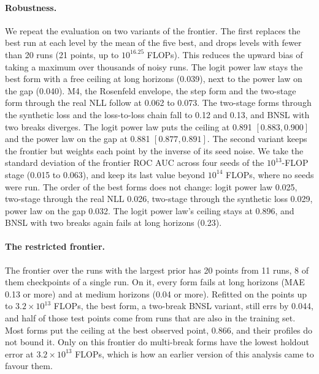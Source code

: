 \paragraph{Robustness.}
We repeat the evaluation on two variants of the frontier. The first replaces the best run at each level by the mean
of the five best, and drops levels with fewer than 20 runs (21 points, up to $10^{16.25}$ FLOPs). This reduces the
upward bias of taking a maximum over thousands of noisy runs. The logit power law stays the best form with a free
ceiling at long horizons (0.039), next to the power law on the gap (0.040). M4, the Rosenfeld envelope, the step form and
the two-stage form through the real NLL follow at 0.062 to 0.073. The two-stage forms through the synthetic loss and the
loss-to-loss chain fall to 0.12 and 0.13, and BNSL with two breaks diverges. The logit power law puts the ceiling at
0.891 $[0.883, 0.900]$ and the power law on the gap at 0.881 $[0.877, 0.891]$. The second variant keeps the frontier but
weights each point by the inverse of its seed noise. We take the standard deviation of the frontier ROC AUC across four
seeds of the $10^{13}$-FLOP stage (0.015 to 0.063), and keep its last value beyond $10^{14}$ FLOPs, where no seeds were
run. The order of the best forms does not change: logit power law 0.025, two-stage through the real NLL 0.026,
two-stage through the synthetic loss 0.029, power law on the gap 0.032. The logit power law's ceiling stays at 0.896,
and BNSL with two breaks again fails at long horizons (0.23).

\paragraph{The restricted frontier.}
The frontier over the runs with the largest prior has 20 points from 11 runs, 8 of them checkpoints of a single run.
On it, every form fails at long horizons (MAE 0.13 or more) and at medium horizons (0.04 or more). Refitted on the points
up to $3.2\times10^{13}$ FLOPs, the best form, a two-break BNSL variant, still errs by 0.044, and half of those test
points come from runs that are also in the training set. Most forms put the ceiling at the best observed point, 0.866,
and their profiles do not bound it. Only on this frontier do multi-break forms have the lowest holdout error at $3.2\times10^{13}$ FLOPs, which is how
an earlier version of this analysis came to favour them.
